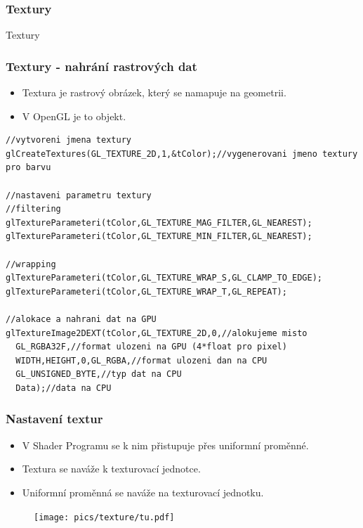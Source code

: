\begin{frame}
\frametitle{Textury}
\begin{center}
\Huge {\color{white}Textury}
\end{center}
\end{frame}

\begin{frame}[fragile]
\frametitle{Textury - nahrání rastrových dat}
	\begin{itemize}
	\item Textura je rastrový obrázek, který se namapuje na geometrii.
	\item V OpenGL je to objekt.
\end{itemize}
{\scriptsize
\begin{verbatim}
//vytvoreni jmena textury
glCreateTextures(GL_TEXTURE_2D,1,&tColor);//vygenerovani jmeno textury pro barvu

//nastaveni parametru textury
//filtering
glTextureParameteri(tColor,GL_TEXTURE_MAG_FILTER,GL_NEAREST);
glTextureParameteri(tColor,GL_TEXTURE_MIN_FILTER,GL_NEAREST);

//wrapping
glTextureParameteri(tColor,GL_TEXTURE_WRAP_S,GL_CLAMP_TO_EDGE);
glTextureParameteri(tColor,GL_TEXTURE_WRAP_T,GL_REPEAT);

//alokace a nahrani dat na GPU
glTextureImage2DEXT(tColor,GL_TEXTURE_2D,0,//alokujeme misto
  GL_RGBA32F,//format ulozeni na GPU (4*float pro pixel)
  WIDTH,HEIGHT,0,GL_RGBA,//format ulozeni dan na CPU
  GL_UNSIGNED_BYTE,//typ dat na CPU
  Data);//data na CPU
\end{verbatim}
}
\end{frame}

\begin{frame}[fragile]
\frametitle{Nastavení textur}
	\begin{itemize}
	\item V Shader Programu se k nim přistupuje přes uniformní proměnné.
	\item Textura se naváže k texturovací jednotce.
	\item Uniformní proměnná se naváže na texturovací jednotku.
	\end{itemize}
	\begin{figure}[h]
		\texttt{[image: pics/texture/tu.pdf]}
	\end{figure}
\end{frame}

